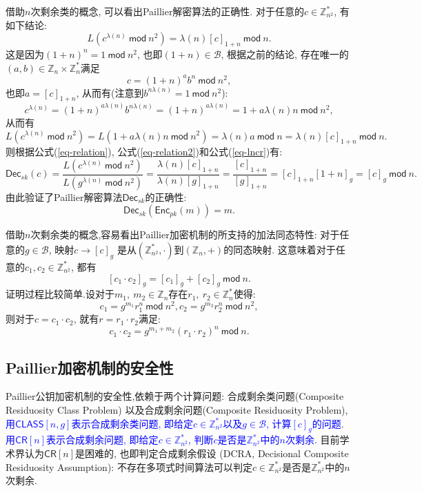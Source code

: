 \documentclass{article}
\newcommand{\Z}{\mathbb{Z}}
\newcommand{\blue}{\textcolor{blue}}
\begin{document}
借助$n$次剩余类的概念, 可以看出Paillier解密算法的正确性.
对于任意的$c\in\Z_{n^2}^*$, 有如下结论:
\begin{equation}\label{eq-lncr}
L(c^{\lambda(n)}~\textsf{mod}~n^2) = \lambda(n)[c]_{1+n}~\textsf{mod}~n.
\end{equation}
这是因为$(1+n)^n = 1 ~\textsf{mod}~n^2$, 也即$(1+n) \in \mathcal{B}$,
根据之前的结论, 存在唯一的$(a,b)\in\Z_n\times\Z_n^*$满足
$$
c = (1+n)^{a}b^n~\textsf{mod}~n^2,
$$
也即$a = [c]_{1+n}$, 从而有(注意到$b^{n\lambda(n)} = 1~\textsf{mod}~n^2$): 
$$
c^{\lambda(n)} = (1+n)^{a\lambda(n)}b^{n\lambda(n)} 
= (1+n)^{a\lambda(n)} = 1 + a\lambda(n)n~\textsf{mod}~n^2,
$$
从而有
$$
L\left(c^{\lambda(n)}~\textsf{mod}~n^2\right) = L\left(1 + a\lambda(n)n~\textsf{mod}~n^2\right) 
= \lambda(n) a ~\textsf{mod}~n = \lambda(n)[c]_{1+n}~\textsf{mod}~n.
$$
则根据公式(\ref{eq-relation}), 公式(\ref{eq-relation2})和公式(\ref{eq-lncr})有:
\begin{equation}\label{eq-decryption}
\textsf{Dec}_{sk}(c) = 
\frac{L\left(c^{\lambda(n)}~\textsf{mod}~n^2\right)}{L\left(g^{\lambda(n)}~\textsf{mod}~n^2\right)} =
\frac{\lambda(n)[c]_{1+n}}{\lambda(n)[g]_{1+n}} = \frac{[c]_{1+n}}{[g]_{1+n}} = 
[c]_{1+n}[1+n]_g = [c]_g ~\textsf{mod}~ n.
\end{equation}
由此验证了Paillier解密算法$\textsf{Dec}_{sk}$的正确性: 
$$
\textsf{Dec}_{sk}\left(\textsf{Enc}_{pk}(m)\right) = m.
$$

借助$n$次剩余类的概念,容易看出Paillier加密机制的所支持的加法同态特性:
对于任意的$g\in\mathcal{B}$, 映射$c\rightarrow [c]_g$
是从$(\Z_{n^2}^*, \cdot)$到$(\Z_n, +)$的同态映射. 
这意味着对于任意的$c_1, c_2 \in\Z_{n^2}^*$, 都有
$$
[c_1 \cdot c_2]_g = [c_1]_g + [c_2]_g ~\textsf{mod}~ n.
$$
证明过程比较简单.设对于$m_1,\ m_2\in \Z_n$存在$r_1,\ r_2 \in \Z_n^*$使得:
$$
c_1 = g^{m_1}r_1^n ~\textsf{mod}~ n^2, c_2 = g^{m_2}r_2^n ~\textsf{mod}~ n^2,
$$
则对于$c = c_1 \cdot c_2$, 就有$r = r_1 \cdot r_2$满足:
$$
c_1\cdot c_2 = g^{m_1 + m_2}(r_1 \cdot r_2)^n ~\textsf{mod}~ n.
$$

\subsection{Paillier加密机制的安全性}

Paillier公钥加密机制的安全性,依赖于两个计算问题: 
合成剩余类问题(Composite Residuosity Class Problem)
以及合成剩余问题(Composite Residuosity Problem),
\blue{用$\textsf{CLASS}[n, g]$表示合成剩余类问题, 即给定$c\in\Z_{n^2}^*$以及$g\in\mathcal{B}$, 
计算$[c]_g$的问题}. \blue{用$\textsf{CR}[n]$表示合成剩余问题, 
即给定$c\in\Z_{n^2}^*$, 判断$c$是否是$\Z_{n^2}^*$中的$n$次剩余.}
目前学术界认为$\textsf{CR}[n]$是困难的, 也即判定合成剩余假设
(DCRA, Decisional Composite Residuosity Assumption):
不存在多项式时间算法可以判定$c\in\Z_{n^2}^*$是否是$\Z_{n^2}^*$中的$n$次剩余.
\end{document}
